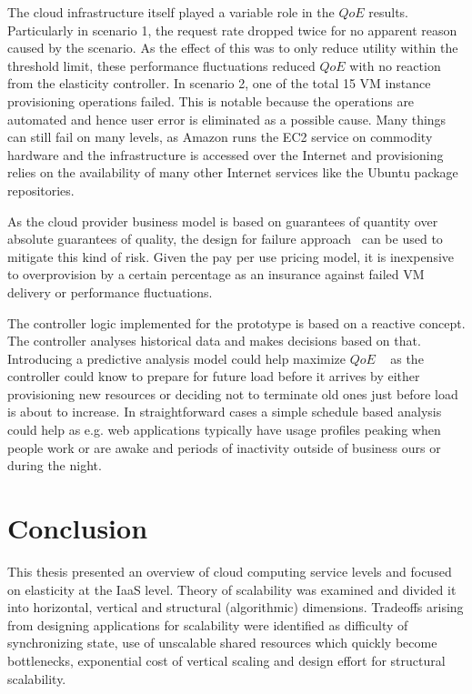\documentclass[english]{tktltiki2}
\theoremstyle{definition}
\theoremstyle{remark}
\begin{document}
The cloud infrastructure itself played a variable role in the $QoE$ results.
Particularly in scenario 1, the request rate dropped twice for no apparent
reason caused by the scenario. As the effect of this was to only reduce utility
within the threshold limit, these performance fluctuations reduced $QoE$ with no
reaction from the elasticity controller. In scenario 2, one of the total 15 VM
instance provisioning operations failed. This is notable because the operations
are automated and hence user error is eliminated as a possible cause. Many
things can still fail on many levels, as Amazon runs the EC2 service on
commodity hardware and the infrastructure is accessed over the Internet and
provisioning relies on the availability of many other Internet services like the
Ubuntu package repositories. 

As the cloud provider business model is based on guarantees of quantity over
absolute guarantees of quality, the design for failure approach~\cite{Varia2010}
can be used to mitigate this kind of risk. Given the pay per use pricing model,
it is inexpensive to overprovision by a certain percentage as an insurance
against failed VM delivery or performance fluctuations.

The controller logic implemented for the prototype is based on a reactive
concept. The controller analyses historical data and makes decisions based on
that. Introducing a predictive analysis model could help maximize $QoE$
~\cite{cloudberkeleyviewacm} as the controller could know to prepare for future
load before it arrives by either provisioning new resources or deciding not to
terminate old ones just before load is about to increase. In straightforward cases
a simple schedule based analysis could help as e.g. web applications typically
have usage profiles peaking when people work or are awake and periods of
inactivity outside of business ours or during the night.

\section{Conclusion}
\label{sec:conclusion}

This thesis presented an overview of cloud computing service levels and focused
on elasticity at the IaaS level. Theory of scalability was examined and divided
it into horizontal, vertical and structural (algorithmic) dimensions. Tradeoffs
arising from designing applications for scalability were identified as
difficulty of synchronizing state, use of unscalable shared resources which
quickly become bottlenecks, exponential cost of vertical scaling and design
effort for structural scalability.
\end{document}
